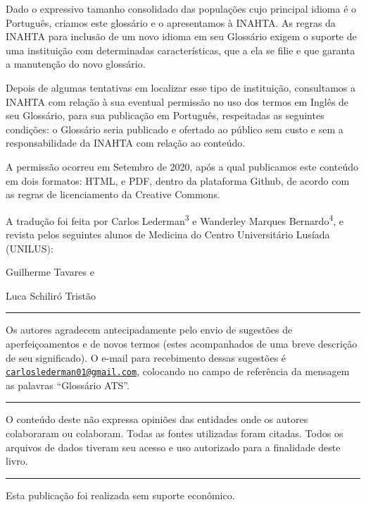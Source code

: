 \documentclass[
  openany]{book}
\begin{document}
Dado o expressivo tamanho consolidado das populações cujo principal idioma é o Português, criamos este glossário e o apresentamos à INAHTA. As regras da INAHTA para inclusão de um novo idioma em seu Glossário exigem o suporte de uma instituição com determinadas características, que a ela se filie e que garanta a manutenção do novo glossário.

Depois de algumas tentativas em localizar esse tipo de instituição, consultamos a INAHTA com relação à sua eventual permissão no uso dos termos em Inglês de seu Glossário, para sua publicação em Português, respeitadas as seguintes condições: o Glossário seria publicado e ofertado ao público sem custo e sem a responsabilidade da INAHTA com relação ao conteúdo.

A permissão ocorreu em Setembro de 2020, após a qual publicamos este conteúdo em dois formatos: HTML, e PDF, dentro da plataforma Github, de acordo com as regras de licenciamento da Creative Commons.

A tradução foi feita por Carlos Lederman\textsuperscript{3} e Wanderley Marques Bernardo\textsuperscript{4}, e revista pelos seguintes alunos de Medicina do Centro Universitário Lusíada (UNILUS):

Guilherme Tavares e

Luca Schiliró Tristão

\begin{center}\rule{0.5\linewidth}{0.5pt}\end{center}

Os autores agradecem antecipadamente pelo envio de sugestões de aperfeiçoamentos e de novos termos (estes acompanhados de uma breve descrição de seu significado). O e-mail para recebimento dessas sugestões é \href{mailto:carloslederman01@gmail.com}{\nolinkurl{carloslederman01@gmail.com}}, colocando no campo de referência da mensagem as palavras ``Glossário ATS''.

\begin{center}\rule{0.5\linewidth}{0.5pt}\end{center}

O conteúdo deste não expressa opiniões das entidades onde os autores colaboraram ou colaboram. Todas as fontes utilizadas foram citadas. Todos os arquivos de dados tiveram seu acesso e uso autorizado para a finalidade deste livro.

\begin{center}\rule{0.5\linewidth}{0.5pt}\end{center}

Esta publicação foi realizada sem suporte econômico.
\end{document}
